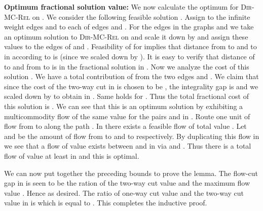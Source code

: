 \documentclass[11pt]{article}
\renewenvironment{proof}{\vspace{-0.1in}\noindent{\bf Proof:}}{\hspace*{\fill}\par}
\def\DirMCRel{\textsc{Dir-MC-Rel}\xspace}
\begin{document}
\begin{proof}
  \noindent\textbf{Optimum fractional solution value:} We now 
  calculate the optimum for \DirMCRel on . We consider the
  following feasible solution . Assign  to the infinite weight
  edges and  to each of edges  and . For the
  edges in the graphs  and  we take an optimum solution  to
  \DirMCRel on  and scale it down by  and assign these
  values to the edges of  and . Feasibility of  for 
  implies that distance from  to  and  to  in 
  according to  is  (since we scaled down by ). It is
  easy to verify that distance of  to  and from  to  is
   in the fractional solution  in . Now we analyze the
  cost of this solution .  We have a
  total contribution of  from the two edges  and
  .  We claim that  since
  the cost of the two-way cut in  is chosen to be
  , the integrality gap is
   and we scaled down  by  to obtain 
  in . Same holds for .  Thus the total fractional cost of this
  solution is . We can see that this is an optimum solution by
  exhibiting a multicommodity flow of the same value for the pairs
   and  in . Route one unit of flow from  to
   along the path . In  there exists a feasible flow of total value
  . Let  and  be the amount of
  flow from  to  and  to  respectively. By duplicating this
  flow in  we see that a flow of value 
  exists between  and  in  via  and . Thus there
  is a total flow of value at least  in 
  and this is optimal.
  

\iffalse
  \noindent\textbf{Maximum flow:} We now calculate the optimum for 
  \DirMCRel on  which by duality is the same as the maximum
  multicommodity flow for the pairs  and  in .
  It is easy to argue that there is an optimum flow in which one unit
  of flow is sent from  to  along the path . We can thus focus on
  the maximum flow in . In this graph all flow from
  has to go through . Thus if  is flow from  to  and
   from  to  then we see that this is feasible if and
  only if there is a feasible flow in  that simultaneously routes
   flow from  to  and  flow from  to . In
  other words, the maximum flow possible in  is
  exactly the same as the maximum flow in  which is a scaled copy
  of .  By induction this is . Thus the maximum flow in  is
   .
\fi
 
  \medskip We can now put together the preceding bounds to prove the
  lemma.  The flow-cut gap in  is seen to be the ration of
  the two-way cut value  and the
  maximum flow value . Hence
   as desired.  The
  ratio of one-way cut value  and the
  two-way cut value  in  is
   which is equal to
  . This completes the inductive proof.
\end{proof}
\end{document}
